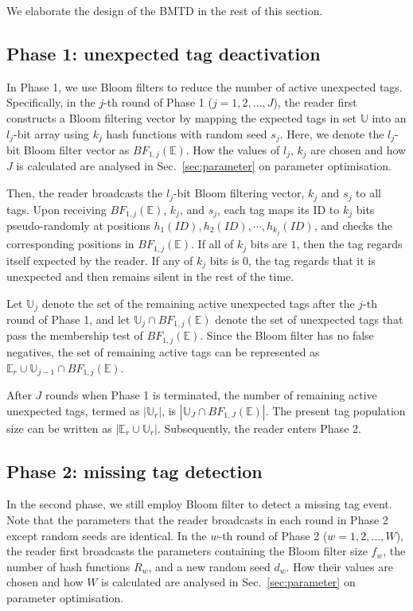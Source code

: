 \documentclass[10pt, twocolumn]{IEEEtran}
\begin{document}
We elaborate the design of the BMTD in the rest of this section.

\subsection{Phase 1: unexpected tag deactivation}

In Phase 1, we use Bloom filters to reduce the number of active unexpected tags. Specifically, in the $j$-th round of Phase 1 ($j=1,2,...,J$), the reader first constructs a Bloom filtering vector by mapping the expected tags in set $\mathbb{U}$ into an $l_j$-bit array using $k_j$ hash functions with random seed $s_j$. Here, we denote the $l_j$-bit Bloom filter vector as $BF_{1,j} (\mathbb{E})$. How the values of $l_j$, $k_j$ are chosen and how $J$ is calculated are analysed in Sec.~\ref{sec:parameter} on parameter optimisation.

Then, the reader broadcasts the $l_j$-bit Bloom filtering vector, $k_j$ and $s_j$ to all tags. Upon receiving $BF_{1,j} (\mathbb{E})$, $k_j$, and $s_j$, each tag maps its ID to $k_j$ bits pseudo-randomly at positions $h_1(ID), h_2(ID),\cdots, h_{k_j}(ID)$, and checks the corresponding positions in $BF_{1,j} (\mathbb{E})$. If all of $k_j$ bits are $1$, then the tag regards itself expected by the reader. If any of $k_j$ bits is $0$, the tag regards that it is unexpected and then remains silent in the rest of the time.

Let $\mathbb{U}_{j}$ denote the set of the remaining active unexpected tags after the $j$-th round of Phase 1, and let $\mathbb{U}_j \cap BF_{1,j} (\mathbb{E})$ denote the set of unexpected tags that pass the membership test of $BF_{1,j} (\mathbb{E})$. Since the Bloom filter has no false negatives, the set of remaining active tags can be represented as $\mathbb{E}_r \cup \mathbb{U}_{j-1} \cap BF_{1,j} (\mathbb{E})$.

After $J$ rounds when Phase 1 is terminated, the number of remaining active unexpected tags, termed as $|\mathbb{U}_{r}|$, is $|\mathbb{U}_{J} \cap BF_{1,J} (\mathbb{E})|$. The present tag population size can be written as $|\mathbb{E}_r \cup \mathbb{U}_{r}|$. Subsequently, the reader enters Phase 2.

\subsection{Phase 2: missing tag detection}
In the second phase, we still employ Bloom filter to detect a missing tag event.
Note that the parameters that the reader broadcasts in each round in Phase 2 except random seeds are identical.
In the $w$-th round of Phase 2 ($w=1,2,...,W$), the reader first broadcasts the parameters containing the Bloom filter size $f_w$, the number of hash functions $R_w$, and a new random seed $d_w$. How their values are chosen and how $W$ is calculated are analysed in Sec.~\ref{sec:parameter} on parameter optimisation.
\end{document}
